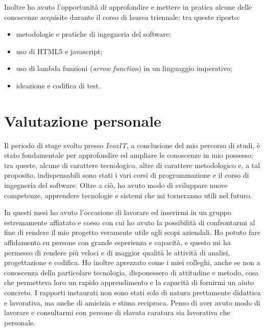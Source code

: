 Inoltre ho avuto l'opportunità di approfondire e mettere in pratica alcune delle conoscenze acquisite durante il corso di laurea triennale; tra queste riporto:
\begin{itemize}
    \item metodologie e pratiche di ingegneria del software;
    \item uso di HTML5 e javascript;
    \item uso di lambda funzioni (\emph{arrow function}) in un linguaggio imperativo;
    \item ideazione e codifica di test.
\end{itemize}


\section{Valutazione personale}
Il periodo di stage svolto presso \emph{IvoxIT}, a conclusione del mio percorso di studi, è stato fondamentale per approfondire ed ampliare le conoscenze in mio possesso; tra queste, alcune di carattere tecnologico, altre di carattere metodologico e, a tal proposito, indispensabili sono stati i vari corsi di programmazione e il corso di ingegneria del software. Oltre a ciò, ho avuto modo di sviluppare nuove competenze, apprendere tecnologie e sistemi che mi torneranno utili nel futuro. 

In questi mesi ho avuto l'occasione di lavorare ed inserirmi in un gruppo estremamente affiatato e coeso con cui ho avuto la possibilità di confrontarmi al fine di rendere il mio progetto veramente utile agli scopi aziendali. Ho potuto fare affidamento su persone con grande esperienza e capacità, e questo mi ha permesso di rendere più veloci e di maggior qualità le attività di analisi, progettazione e codifica. Ho inoltre aprezzato come i miei colleghi, anche se non a conoscenza della particolare tecnologia, disponessero di attitudine e metodo, cosa che permetteva loro un rapido apprendimento e la capacità di fornirmi un aiuto concreto. I rapporti instaurati non sono stati solo di natura prettamente didattica e lavorativa, ma anche di amicizia e stima reciproca. Penso di aver avuto modo di lavorare e consultarmi con persone di elavata caratura sia lavorativa che personale. 

